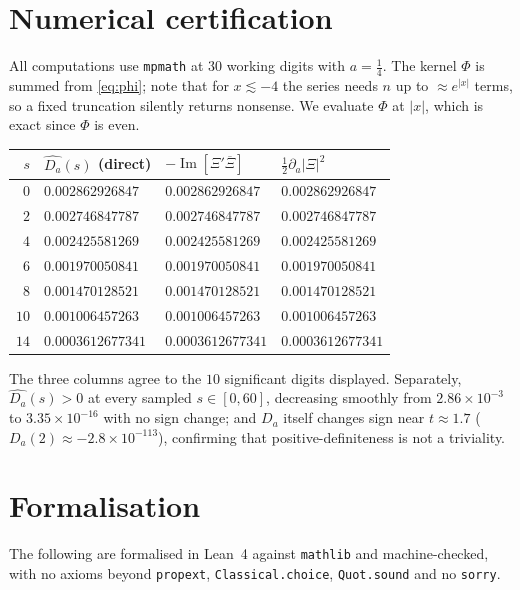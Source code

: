 \documentclass[11pt,a4paper]{amsart}
\theoremstyle{plain}
\theoremstyle{definition}
\newcommand{\Xii}{\Xi}
\newcommand{\Lean}[1]{\texttt{\small #1}}
\begin{document}
\section{Numerical certification}\label{sec:num}

All computations use \texttt{mpmath} at $30$ working digits with $a=\tfrac14$. The kernel $\Phi$ is
summed from \eqref{eq:phi}; note that for $x\lesssim-4$ the series needs $n$ up to $\approx e^{|x|}$
terms, so a fixed truncation silently returns nonsense. We evaluate $\Phi$ at $|x|$, which is exact
since $\Phi$ is even.

\begin{center}
\begin{tabular}{@{}rlll@{}}
\toprule
$s$ & $\widehat{D_a}(s)$ (direct) & $-\operatorname{Im}[\Xii'\overline{\Xii}]$
    & $\tfrac12\partial_a|\Xii|^2$ \\
\midrule
$0$  & $0.002862926847$  & $0.002862926847$  & $0.002862926847$ \\
$2$  & $0.002746847787$  & $0.002746847787$  & $0.002746847787$ \\
$4$  & $0.002425581269$  & $0.002425581269$  & $0.002425581269$ \\
$6$  & $0.001970050841$  & $0.001970050841$  & $0.001970050841$ \\
$8$  & $0.001470128521$  & $0.001470128521$  & $0.001470128521$ \\
$10$ & $0.001006457263$  & $0.001006457263$  & $0.001006457263$ \\
$14$ & $0.0003612677341$ & $0.0003612677341$ & $0.0003612677341$ \\
\bottomrule
\end{tabular}
\end{center}

The three columns agree to the $10$ significant digits displayed. Separately, $\widehat{D_a}(s)>0$
at every sampled $s\in[0,60]$, decreasing smoothly from $2.86\times10^{-3}$ to
$3.35\times10^{-16}$ with no sign change; and $D_a$ itself changes sign near $t\approx1.7$
($D_a(2)\approx-2.8\times10^{-113}$), confirming that positive-definiteness is not a triviality.

\section{Formalisation}

The following are formalised in Lean~4 against \texttt{mathlib} and machine-checked, with no axioms
beyond \Lean{propext}, \Lean{Classical.choice}, \Lean{Quot.sound} and no \Lean{sorry}.
\end{document}
